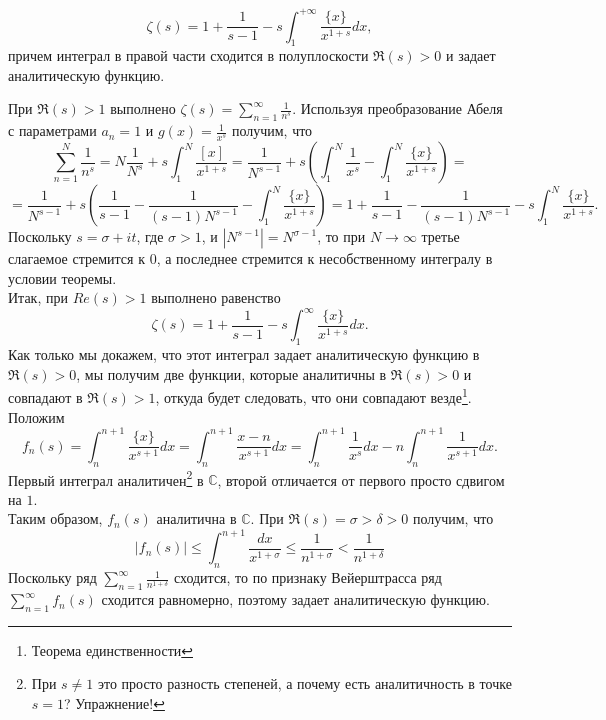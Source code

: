 \begin{theorem} \label{l3_thm5}
	$$\zeta(s) = 1 + \frac{1}{s - 1} - s \int_{1}^{+\infty} \frac{\{x\}}{x^{1 + s}} dx,$$
	причем интеграл в правой части сходится в полуплоскости $\Re(s) > 0$ и задает аналитическую функцию.
\end{theorem}
\begin{pf}
	При $\Re(s) > 1$ выполнено $\displaystyle \zeta(s) = \sum_{n = 1}^{\infty} \frac{1}{n^s}$. Используя преобразование Абеля с параметрами $a_n = 1$ и $\displaystyle g(x) = \frac{1}{x^s}$ получим, что
	$$\sum_{n = 1}^{N} \frac{1}{n^s} = N \frac{1}{N^s} + s \int_{1}^{N}\frac{[x]}{x^{1 + s}} = \frac{1}{N^{s - 1}} + s \left( \int_{1}^{N}\frac{1}{x^s} - \int_{1}^{N}\frac{\{x\}}{x^{1 + s}}\right) = $$
	$$ = \frac{1}{N^{s - 1}} + s \left( \frac{1}{s - 1} - \frac{1}{(s - 1)N^{s - 1}} - \int_{1}^{N}\frac{\{x\}}{x^{1 + s}}\right) = 1 + \frac{1}{s - 1} - \frac{1}{(s - 1)N^{s - 1}} - s \int_{1}^{N}\frac{\{x\}}{x^{1 + s}}.$$
	Поскольку $s = \sigma + i t$, где $\sigma > 1$, и $|N^{s - 1}| = N^{\sigma - 1}$, то при $N \rightarrow \infty $ третье слагаемое стремится к 0, а последнее стремится к несобственному интегралу в условии теоремы.\\
	Итак, при $Re(s) > 1$ выполнено равенство
	$$\zeta(s) = 1 + \frac{1}{s - 1} - s \int_{1}^{\infty} \frac{\{x\}}{x^{1 + s}} dx.$$
	Как только мы докажем, что этот интеграл задает аналитическую функцию в $\Re(s) > 0$, мы получим	две функции, которые аналитичны в $\Re(s) > 0$ и совпадают  в $\Re(s) > 1$, откуда будет следовать, что они совпадают везде\footnote{Теорема единственности}.\\
	Положим
	$$f_n(s) = \int_{n}^{n + 1} \frac{\{x\}}{x^{s + 1}} dx = \int_{n}^{n + 1} \frac{x - n}{x^{s + 1}} dx = \int_{n}^{n + 1} \frac{1}{x^{s}} dx - n \int_{n}^{n + 1} \frac{1}{x^{s + 1}} dx.$$
	Первый интеграл аналитичен\footnote{При $s \ne 1$ это просто разность степеней, а почему есть аналитичность в точке $s = 1$? Упражнение!} в $\mathbb{C}$, второй отличается от первого просто сдвигом на $1$.\\
	Таким образом, $f_n(s)$ аналитична в $\mathbb{C}$. При $\Re(s) = \sigma > \delta > 0$ получим, что
	$$|f_n(s)| \leq \int_{n}^{n + 1} \frac{dx}{x^{1 + \sigma}} \leq \frac{1}{n^{1 + \sigma}} < \frac{1}{n^{1 + \delta}}$$
	Поскольку ряд $\displaystyle \sum_{n = 1}^{\infty} \frac{1}{n^{1 + \delta}}$ сходится, то по признаку Вейерштрасса ряд $\displaystyle \sum_{n = 1}^{\infty} f_n(s)$ сходится равномерно, поэтому задает аналитическую функцию.
\end{pf}

